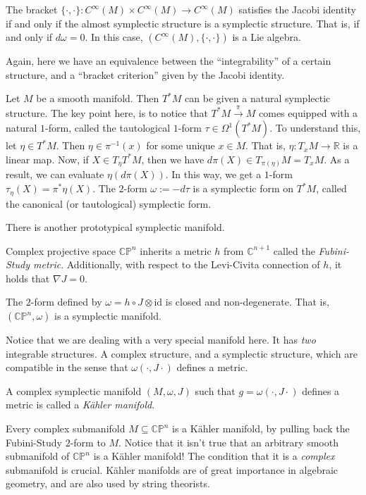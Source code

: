 \begin{theorem}
  The bracket $\{\cdot,\cdot\}:C^\infty(M)\times C^\infty(M)\to C^\infty(M)$ satisfies the Jacobi identity if and only if the almost symplectic structure is a symplectic structure. That is, if and only if $d\omega=0$. In this case, $(C^\infty(M),\{\cdot,\cdot\})$ is a Lie algebra.
\end{theorem}
Again, here we have an equivalence between the ``integrability'' of a certain structure, and a ``bracket criterion'' given by the Jacobi identity.
\begin{example}
  Let $M$ be a smooth manifold. Then $T^*M$ can be given a natural symplectic structure. The key point here, is to notice that $T^*M\xrightarrow{\pi}M$ comes equipped with a natural $1$-form, called the tautological $1$-form $\tau\in\Omega^1(T^*M)$. To understand this, let $\eta\in T^*M$. Then $\eta\in \pi^{-1}(x)$ for some unique $x\in M$. That is, $\eta:T_xM\to \mathbb{R}$ is a linear map. Now, if $X\in T_\eta T^*M$, then we have $d\pi(X)\in T_{\pi(\eta)}M=T_xM$. As a result, we can evaluate $\eta(d\pi(X))$. In this way, we get a $1$-form $\tau_\eta(X)=\pi^*\eta(X)$. The $2$-form $\omega:=-d\tau$ is a symplectic form on $T^*M$, called the canonical (or tautological) symplectic form.
\end{example}
There is another prototypical symplectic manifold.
\begin{theorem}
  Complex projective space $\mathbb{CP}^n$ inherits a metric $h$ from $\mathbb{C}^{n+1}$ called the \emph{Fubini-Study metric}. Additionally, with respect to the Levi-Civita connection of $h$, it holds that $\nabla J=0$.  
\end{theorem}
\begin{corollary}
    The $2$-form defined by $\omega=h\circ J\otimes\text{id}$ is closed and non-degenerate. That is, $(\mathbb{CP}^n, \omega)$ is a symplectic manifold.
\end{corollary}
Notice that we are dealing with a very special manifold here. It has \textit{two} integrable structures. A complex structure, and a symplectic structure, which are compatible in the sense that $\omega(\cdot, J\cdot)$ defines a metric.
\begin{definition}
    A complex symplectic manifold $(M,\omega, J)$ such that $g=\omega(\cdot, J\cdot)$ defines a metric is called a \emph{Kähler manifold}.
\end{definition}
\begin{example}
    Every complex submanifold $M\subseteq\mathbb{CP}^n$ is a Kähler manifold, by pulling back the Fubini-Study $2$-form to $M$. Notice that it isn't true that an arbitrary smooth submanifold of $\mathbb{CP}^n$ is a Kähler manifold! The condition that it is a \textit{complex} submanifold is crucial. Kähler manifolds are of great importance in algebraic geometry, and are also used by string theorists. 
\end{example}

